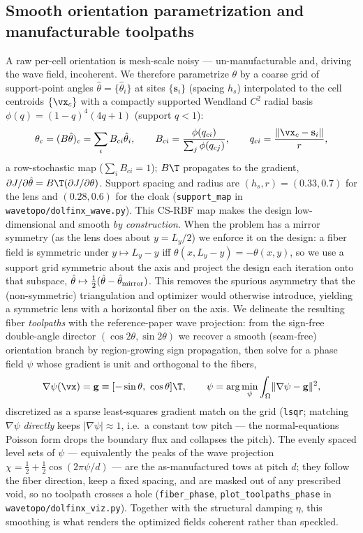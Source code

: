 \documentclass[11pt]{article}
\begin{document}
\subsection{Smooth orientation parametrization and manufacturable toolpaths}
\label{sec:rbf}
A raw per-cell orientation is mesh-scale noisy --- un-manufacturable and, driving
the wave field, incoherent. We therefore parametrize $\theta$ by a coarse grid of
support-point angles $\hat\theta=\{\hat\theta_i\}$ at sites $\{\mathbf s_i\}$
(spacing $h_s$) interpolated to the cell centroids $\{\vx_c\}$ with a compactly
supported Wendland $C^2$ radial basis $\phi(q)=(1-q)^4(4q+1)$ (support $q<1$):
\begin{equation}
  \theta_c=(B\hat\theta)_c=\sum_i B_{ci}\hat\theta_i,\qquad
  B_{ci}=\frac{\phi(q_{ci})}{\sum_j\phi(q_{cj})},\qquad
  q_{ci}=\frac{\lVert\vx_c-\mathbf s_i\rVert}{r},
  \label{eq:rbf}
\end{equation}
a row-stochastic map ($\sum_i B_{ci}=1$); $B\T$ propagates to the gradient,
$\partial J/\partial\hat\theta=B\T(\partial J/\partial\theta)$. Support spacing and
radius are $(h_s,r)=(0.33,0.7)$ for the lens and $(0.28,0.6)$ for the cloak
(\texttt{support\_map} in \texttt{wavetopo/dolfinx\_wave.py}). This CS-RBF map makes
the design low-dimensional and smooth \emph{by construction}. When the problem has a mirror symmetry (as the
lens does about $y=L_y/2$) we enforce it on the design: a fiber field is
symmetric under $y\!\mapsto\!L_y-y$ iff $\theta(x,L_y-y)=-\theta(x,y)$, so we use
a support grid symmetric about the axis and project the design each iteration
onto that subspace, $\hat\theta\mapsto\tfrac12(\hat\theta-\hat\theta_{\rm mirror})$.
This removes the spurious asymmetry that the (non-symmetric) triangulation and
optimizer would otherwise introduce, yielding a symmetric lens with a horizontal
fiber on the axis. We delineate the resulting fiber \emph{toolpaths} with the
reference-paper wave projection: from the sign-free double-angle director
$(\cos2\theta,\sin2\theta)$ we recover a smooth (seam-free) orientation branch by
region-growing sign propagation, then solve for a phase field $\psi$ whose gradient
is unit and orthogonal to the fibers,
\begin{equation}
  \nabla\psi(\vx)=\mathbf g\equiv[-\sin\theta,\ \cos\theta]\T,\qquad
  \psi=\arg\min_{\psi}\int_\Omega\lVert\nabla\psi-\mathbf g\rVert^2 ,
  \label{eq:phase}
\end{equation}
discretized as a sparse least-squares gradient match on the grid (\texttt{lsqr};
matching $\nabla\psi$ \emph{directly} keeps $|\nabla\psi|\!\approx\!1$, i.e.\ a
constant tow pitch --- the normal-equations Poisson form drops the boundary flux
and collapses the pitch). The evenly spaced level sets of $\psi$ --- equivalently
the peaks of the wave projection $\chi=\tfrac12+\tfrac12\cos(2\pi\psi/d)$ --- are
the as-manufactured tows at pitch $d$; they follow the fiber direction, keep a
fixed spacing, and are masked out of any prescribed void, so no toolpath crosses a
hole (\texttt{fiber\_phase}, \texttt{plot\_toolpaths\_phase} in
\texttt{wavetopo/dolfinx\_viz.py}). Together with the structural damping $\eta$,
this smoothing is what renders the optimized fields coherent rather than speckled.
\end{document}
